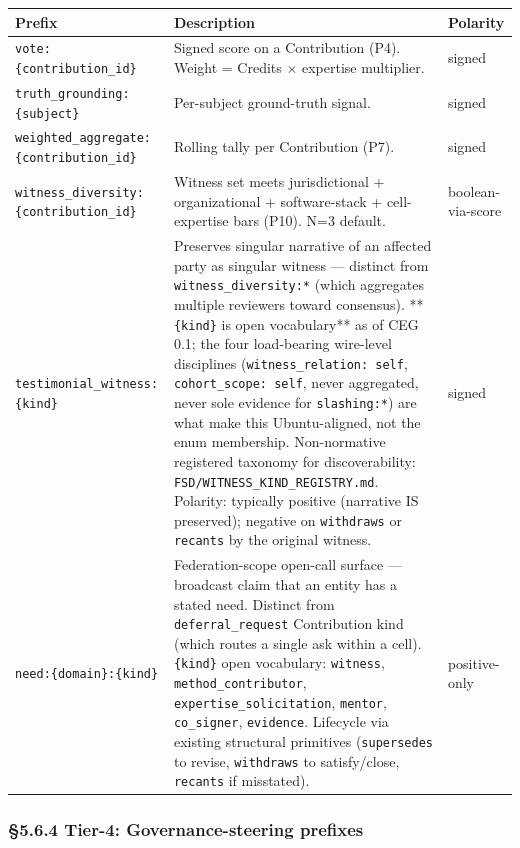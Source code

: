 \documentclass[10pt]{article}
\begin{document}
{\footnotesize
\begin{longtable}{|p{5.33cm}|p{5.33cm}|p{5.33cm}|}\hline
\textbf{Prefix} & \textbf{Description} & \textbf{Polarity} \\ \hline\endhead
\texttt{vote:\{contribution\_id\}} & Signed score on a Contribution (P4). Weight = Credits × expertise multiplier. & signed \\ \hline
\texttt{truth\_grounding:\{subject\}} & Per-subject ground-truth signal. & signed \\ \hline
\texttt{weighted\_aggregate:\{contribution\_id\}} & Rolling tally per Contribution (P7). & signed \\ \hline
\texttt{witness\_diversity:\{contribution\_id\}} & Witness set meets jurisdictional + organizational + software-stack + cell-expertise bars (P10). N=3 default. & boolean-via-score \\ \hline
\texttt{testimonial\_witness:\{kind\}} & Preserves singular narrative of an affected party as singular witness — distinct from \texttt{witness\_diversity:*} (which aggregates multiple reviewers toward consensus). **\texttt{\{kind\}} is open vocabulary** as of CEG 0.1; the four load-bearing wire-level disciplines (\texttt{witness\_relation: self}, \texttt{cohort\_scope: self}, never aggregated, never sole evidence for \texttt{slashing:*}) are what make this Ubuntu-aligned, not the enum membership. Non-normative registered taxonomy for discoverability: \texttt{FSD/WITNESS\_KIND\_REGISTRY.md}. Polarity: typically positive (narrative IS preserved); negative on \texttt{withdraws} or \texttt{recants} by the original witness. & signed \\ \hline
\texttt{need:\{domain\}:\{kind\}} & Federation-scope open-call surface — broadcast claim that an entity has a stated need. Distinct from \texttt{deferral\_request} Contribution kind (which routes a single ask within a cell). \texttt{\{kind\}} open vocabulary: \texttt{witness}, \texttt{method\_contributor}, \texttt{expertise\_solicitation}, \texttt{mentor}, \texttt{co\_signer}, \texttt{evidence}. Lifecycle via existing structural primitives (\texttt{supersedes} to revise, \texttt{withdraws} to satisfy/close, \texttt{recants} if misstated). & positive-only \\ \hline
\end{longtable}}


\subsubsection*{§5.6.4 Tier-4: Governance-steering prefixes}
\end{document}
